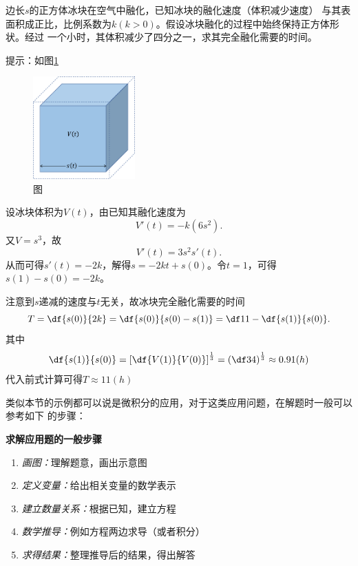 \bs
\egz 边长$s$的正方体冰块在空气中融化，已知冰块的融化速度（体积减少速度）
与其表面积成正比，比例系数为$k(k>0)$。假设冰块融化的过程中始终保持正方体形状。经过
一个小时，其体积减少了四分之一，求其完全融化需要的时间。


提示：如图\ref{fig:iceMelting}
\begin{figure}[h]
	\centering
	\includegraphics[width=0.35\textwidth]
	{./Images/Ch02/iceMelting.pdf}
	\caption{\exNo 图}
	\label{fig:iceMelting}
\end{figure}
设冰块体积为$V(t)$，由已知其融化速度为
$$V'(t)=-k(6s^2).$$
又$V=s^3$，故
$$V'(t)=3s^2s'(t).$$
从而可得$s'(t)=-2k$，解得$s=-2kt+s(0)$。令$t=1$，可得$s(1)-s(0)=-2k$。

注意到$s$递减的速度与$t$无关，故冰块完全融化需要的时间
$$T=\df{s(0)}{2k}=\df{s(0)}{s(0)-s(1)}=\df1{1-\df{s(1)}{s(0)}}.$$
其中
$$\df{s(1)}{s(0)}=\left[\df{V(1)}{V(0)}\right]^{\frac13}=
\left(\df34\right)^{\frac13}\approx0.91(h)$$
代入前式计算可得$T\approx11(h)$

类似本节的示例都可以说是微积分的应用，对于这类应用问题，在解题时一般可以参考如下
的步骤：
\begin{thx}
	{\bf 求解应用题的一般步骤}
	\begin{enumerate}
	  \item {{\it 画图：}}理解题意，画出示意图
	  \item {{\it 定义变量：}}给出相关变量的数学表示
	  \item {{\it 建立数量关系：}}根据已知，建立方程
	  \item {{\it 数学推导：}}例如方程两边求导（或者积分）
	  \item {{\it 求得结果：}}整理推导后的结果，得出解答
	\end{enumerate}
\end{thx}

